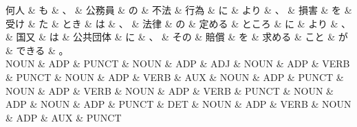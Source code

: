 \documentclass[tikz,border=5pt]{standalone}
\begin{document}
\small
\begin{dependency}[edge unit distance=12.0pt]
    \begin{deptext}[column sep=0.5em]
        何人 \& も \& 、 \& 公務員 \& の \& 不法 \& 行為 \& に \& より \& 、 \& 損害 \& を \& 受け \& た \& とき \& は \& 、 \& 法律 \& の \& 定める \& ところ \& に \& より \& 、 \& 国又 \& は \& 公共団体 \& に \& 、 \& その \& 賠償 \& を \& 求める \& こと \& が \& できる \& 。\\
        NOUN \& ADP \& PUNCT \& NOUN \& ADP \& ADJ \& NOUN \& ADP \& VERB \& PUNCT \& NOUN \& ADP \& VERB \& AUX \& NOUN \& ADP \& PUNCT \& NOUN \& ADP \& VERB \& NOUN \& ADP \& VERB \& PUNCT \& NOUN \& ADP \& NOUN \& ADP \& PUNCT \& DET \& NOUN \& ADP \& VERB \& NOUN \& ADP \& AUX \& PUNCT\\
    \end{deptext}
\end{dependency}
\end{document}
